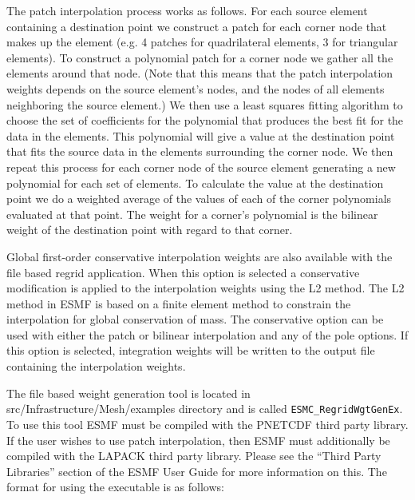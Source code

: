 The patch interpolation process works as follows. 
For each source element containing a destination point
we construct a patch for each corner node that makes up the element (e.g. 4 patches for 
quadrilateral elements, 3 for triangular elements). To construct a polynomial patch for
 a corner node we gather all the elements around that node. 
(Note that this means that the patch interpolation weights depends on the source 
element's nodes, and the nodes of all elements neighboring the source element.)  
We then use a least squares fitting algorithm to choose the set of coefficients 
for the polynomial that produces the best fit for the data in the elements. 
This polynomial will give a value at the destination point that fits the source data 
in the elements surrounding the corner node. We then repeat this process for each 
corner node of the source element generating a new polynomial for each set of elements.  
To calculate the value at the destination point we do a weighted average of the values 
of each of the corner polynomials evaluated at that point. The weight for a corner's 
polynomial is the bilinear weight of the destination point with regard to that corner.  

Global first-order conservative interpolation weights are also available with the 
file based regrid application. When this option is selected a conservative modification
is applied to the interpolation weights using the L2 method.  The L2 method in ESMF is based
on a finite element method to constrain the interpolation for global conservation of 
mass.  The conservative option can be used with either the patch or bilinear interpolation
and any of the pole options.  If this option is selected, integration weights will be
written to the output file containing the interpolation weights.

The file based weight generation tool is located in src/Infrastructure/Mesh/examples 
directory and is called {\tt ESMC\_RegridWgtGenEx}. To use this tool ESMF must be compiled 
with the PNETCDF third party library. If the user wishes to use patch interpolation, 
then ESMF must additionally be compiled with the LAPACK third party library. Please see the 
``Third Party Libraries'' section of the ESMF User Guide for more information on this. 
The format for using the executable is as follows:

